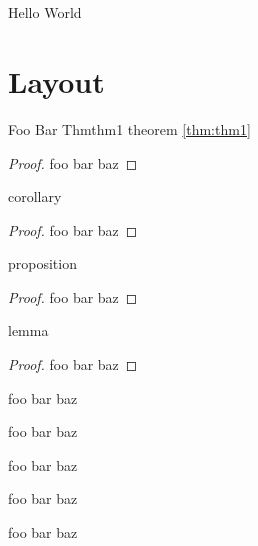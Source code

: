 \chapter{}
Hello World

\chapter{Layout}

\begin{theorem}{Foo Bar Thm}{thm1}
theorem
\ref{thm:thm1}
\end{theorem}

\begin{proof}
foo bar baz
\end{proof}

\begin{corollary}{}{}
corollary
\end{corollary}

\begin{proof}
foo bar baz
\end{proof}


\begin{proposition}{}{}
proposition
\end{proposition}

\begin{proof}
foo bar baz
\end{proof}


\begin{lemma}{}{}
lemma
\end{lemma}

\begin{proof}
foo bar baz
\end{proof}


\begin{fact}{}{}
foo bar baz
\end{fact}

\begin{notation}{}{}
foo bar baz
\end{notation}

\begin{definition}{}{}
foo bar baz
\end{definition}

\begin{example}{}{}
foo bar baz
\end{example}

\begin{myremark}{}{}
foo bar baz
\end{myremark}